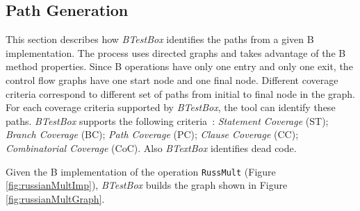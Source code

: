 \documentclass[runningheads]{llncs}
\begin{document}
\subsection{Path Generation}

This section describes how \textit{BTestBox} identifies the paths from a given B implementation. 
The process uses directed graphs and takes advantage of the B method properties. Since B operations have only one entry 
and only one exit, the control flow graphs have one start node and one final node. Different coverage criteria correspond
to different set of paths from initial to final node in the graph.
For each coverage criteria supported by \textit{BTestBox}, the tool can identify these paths. \textit{BTestBox} supports the following criteria~\cite{ammann2008introduction}:
\textit{Statement Coverage} (ST); 
\textit{Branch Coverage} (BC);
\textit{Path Coverage} (PC);
\textit{Clause Coverage} (CC);
\textit{Combinatorial Coverage} (CoC).
Also \textit{BTextBox} identifies dead code. 

Given the B implementation of the operation \texttt{RussMult} (Figure \ref{fig:russianMultImp}), \textit{BTestBox} builds the graph shown in Figure \ref{fig:russianMultGraph}.
        
\end{document}
